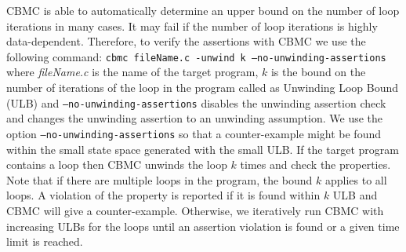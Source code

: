 CBMC is able to automatically determine an upper bound on the number of loop iterations
in many cases. It  may fail if the number of loop iterations is highly data-dependent.
Therefore, to verify the assertions with CBMC we use the following command:
\texttt{cbmc fileName.c -unwind k --no-unwinding-assertions} where 
\textit{fileName.c} is the name of the target program, $k$ is the bound on the 
number of iterations of the loop in the program called as Unwinding Loop 
Bound (ULB) and \texttt{--no-unwinding-assertions} disables the unwinding assertion 
check and changes the unwinding assertion to an unwinding assumption. We use the 
option \texttt{--no-unwinding-assertions} so that a counter-example 
might be found within the small state space generated with the small ULB. If 
the target program contains a loop then CBMC unwinds the loop $k$ times 
and check the properties. Note that if there are multiple loops in the program, 
the bound $k$ applies to all loops. A violation of the property is reported if 
it is found within $k$ ULB and CBMC will give a counter-example. Otherwise, we 
iteratively run CBMC with increasing ULBs for the loops until an 
assertion violation is found or a given time limit is reached. 
\begin{comment}
There are two 
possible outcomes by CBMC for a given ULB.
\begin{itemize}
\item \textit{Counter-example:} The CBMC reports a counter-example, i.e., it 
has 
found input data within a given ULB for which the user-defined assertion is not 
valid.
\item \textit{No counter-example:} There are two possibilities when CBMC does not 
report a counter-example for a given ULB.
\begin{itemize}
\item CBMC hits the time limit and no counter-example has been found. In 
this case it is possible that the user-defined assertions are indeed valid  
or the counterexamples are too complex to be found within a given time limit.
\item CBMC does not hit the time limit and does not report a counter-example. 
In this case, if unwinding assertion fails (i.e., the loop can execute more then 
ULB times) then we execute CBMC with increasing number of ULBs. Otherwise, CBMC 
proved assertions to be valid, it indeed was.
\end{itemize}
\end{itemize}

Note that if no counterexample is found with depth $k$ then unwinding assertion 
is verified 
along with the user defined assertion.
if unwinding assertion fails then a violation of the property could still occur 
in further iterations of the loop. Hence  Otherwise CBMC proved a property to 
be valid, it indeed 
was.

we used 1000 second timeout for CBMC.
For our experiment we used CBMC (built from revision 4503,
used with Z3 as the decision procedure)

No counterexample The tool has hit the time limit and no counterexample has 
been found. Thus, either the solution is correct or the counterexamples are too 
complex to be found within the available time.
\end{comment}

